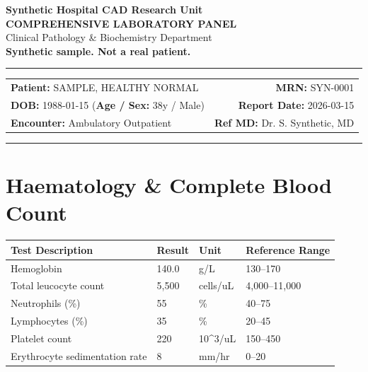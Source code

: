\documentclass[10pt,a4paper]{article}
\begin{document}
\begin{center}
  {\Large \textbf{Synthetic Hospital CAD Research Unit}}\\
  \vspace{2pt}
  {\normalsize \textbf{COMPREHENSIVE LABORATORY PANEL}}\\
  \vspace{1pt}
  {\footnotesize \textcolor{subtext}{Clinical Pathology \& Biochemistry Department}}\\
  \vspace{4pt}
  {\small \textbf{\textcolor{red!75!black}{Synthetic sample. Not a real patient.}}}\\
  \vspace{3pt}
  \textcolor{linecolor}{\rule{\textwidth}{0.8pt}}
\end{center}

\vspace{2pt}

\noindent
\begin{tabular*}{\textwidth}{@{} l @{\extracolsep{\fill}} r @{}}
  \textbf{Patient:} SAMPLE, HEALTHY NORMAL & \textbf{MRN:} SYN-0001 \\
  \textbf{DOB:} 1988-01-15 \quad (\textbf{Age / Sex:} 38y / Male) & \textbf{Report Date:} 2026-03-15 \\
  \textbf{Encounter:} Ambulatory Outpatient & \textbf{Ref MD:} Dr. S. Synthetic, MD \\
\end{tabular*}

\vspace{2pt}
\noindent\textcolor{linecolor}{\rule{\textwidth}{0.4pt}}
\vspace{6pt}


\section*{Haematology \& Complete Blood Count}

\begin{tabular}{@{} p{6.4cm} p{2.5cm} p{2.5cm} p{3.1cm} @{}}
  \toprule
  \textbf{Test Description} & \textbf{Result} & \textbf{Unit} & \textbf{Reference Range} \\
  \midrule
  Hemoglobin & 140.0 & g/L & 130--170 \\
  Total leucocyte count & 5,500 & cells/uL & 4,000--11,000 \\
  Neutrophils (\%) & 55 & \% & 40--75 \\
  Lymphocytes (\%) & 35 & \% & 20--45 \\
  Platelet count & 220 & 10\textasciicircum 3/uL & 150--450 \\
  Erythrocyte sedimentation rate & 8 & mm/hr & 0--20 \\
  \bottomrule
\end{tabular}
\end{document}
